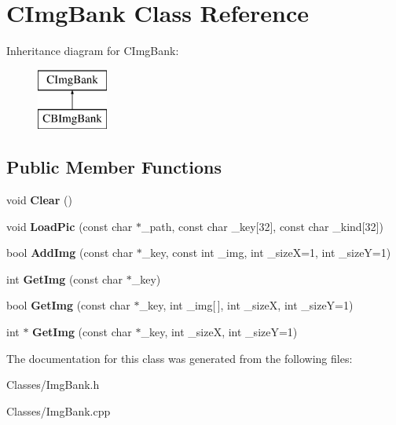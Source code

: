 \hypertarget{class_c_img_bank}{}\section{C\+Img\+Bank Class Reference}
\label{class_c_img_bank}
Inheritance diagram for C\+Img\+Bank\+:\begin{figure}[H]
\begin{center}
\leavevmode
\includegraphics[height=2.000000cm]{class_c_img_bank}
\end{center}
\end{figure}
\subsection*{Public Member Functions}
\begin{DoxyCompactItemize}
\item 
void {\bfseries Clear} ()\hypertarget{class_c_img_bank_acbdbc031eaf2e16321bdb3218bd5c08a}{}\label{class_c_img_bank_acbdbc031eaf2e16321bdb3218bd5c08a}

\item 
void {\bfseries Load\+Pic} (const char $\ast$\+\_\+path, const char \+\_\+key\mbox{[}32\mbox{]}, const char \+\_\+kind\mbox{[}32\mbox{]})\hypertarget{class_c_img_bank_a827283e201d031f05f13cabdb438ae43}{}\label{class_c_img_bank_a827283e201d031f05f13cabdb438ae43}

\item 
bool {\bfseries Add\+Img} (const char $\ast$\+\_\+key, const int \+\_\+img, int \+\_\+sizeX=1, int \+\_\+sizeY=1)\hypertarget{class_c_img_bank_a48fd9cfdf57467cdae838856dc4dda17}{}\label{class_c_img_bank_a48fd9cfdf57467cdae838856dc4dda17}

\item 
int {\bfseries Get\+Img} (const char $\ast$\+\_\+key)\hypertarget{class_c_img_bank_aa22ec27911957938443c1a82a513f359}{}\label{class_c_img_bank_aa22ec27911957938443c1a82a513f359}

\item 
bool {\bfseries Get\+Img} (const char $\ast$\+\_\+key, int \+\_\+img\mbox{[}$\,$\mbox{]}, int \+\_\+sizeX, int \+\_\+sizeY=1)\hypertarget{class_c_img_bank_a507ac682ef4edf4294fe00100bf5f218}{}\label{class_c_img_bank_a507ac682ef4edf4294fe00100bf5f218}

\item 
int $\ast$ {\bfseries Get\+Img} (const char $\ast$\+\_\+key, int \+\_\+sizeX, int \+\_\+sizeY=1)\hypertarget{class_c_img_bank_a9297e7c5ab76a0a6bc7f89785db02ad3}{}\label{class_c_img_bank_a9297e7c5ab76a0a6bc7f89785db02ad3}

\end{DoxyCompactItemize}


The documentation for this class was generated from the following files\+:\begin{DoxyCompactItemize}
\item 
Classes/Img\+Bank.\+h\item 
Classes/Img\+Bank.\+cpp\end{DoxyCompactItemize}
